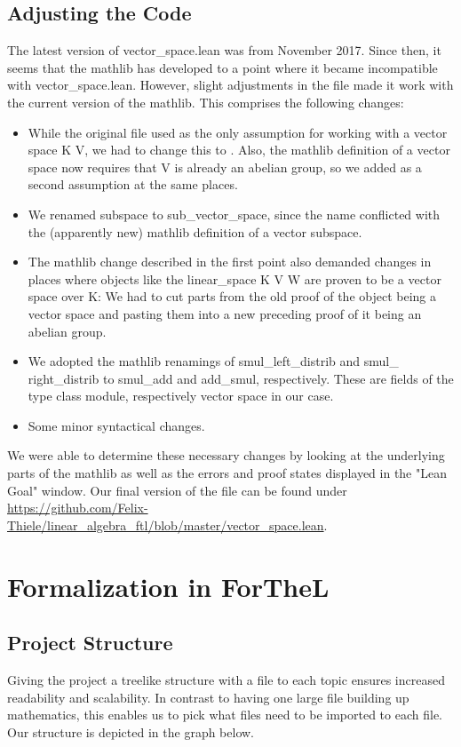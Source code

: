 \documentclass[11pt]{article}
\begin{document}
\subsection{Adjusting the Code}
The latest version of vector\_space.lean was from November 2017. Since then, it seems that the mathlib has developed to a point where it became incompatible with vector\_space.lean.
However, slight adjustments in the file made it work with the current version of the mathlib. This comprises the following changes:
\begin{itemize}
\item While the original file used {\ftl [field K]} as the only assumption for working with a {\ftl vector space K V}, we had to change this to {}. Also, the mathlib definition of a vector space now requires that V is already an abelian group, so we added {} as a second assumption at the same places.
\item We renamed {\lean subspace} to {\lean sub\_vector\_space}, since the name conflicted with the (apparently new) mathlib definition of a vector subspace.
\item The mathlib change described in the first point also demanded changes in places where objects like the {\lean linear\_space K V W} are proven to be a vector space over K: We had to cut parts from the old proof of the object being a vector space and pasting them into a new preceding proof of it being an abelian group. 
\item We adopted the mathlib renamings of {\lean smul\_left\_distrib} and {\lean smul\_ right\_distrib} to {\lean smul\_add} and {\lean add\_smul}, respectively. These are fields of the type class {\lean module}, respectively {\lean vector space} in our case.
\item Some minor syntactical changes.
\end{itemize}
We were able to determine these necessary changes by looking at the underlying parts of the mathlib as well as the errors and proof states displayed in the "Lean Goal" window. Our final version of the file can be found under \url{https://github.com/Felix-Thiele/linear_algebra_ftl/blob/master/vector_space.lean}.



\newpage
\lstset{style=ftl}
\section{Formalization in ForTheL}
\subsection{Project Structure}
Giving the project a treelike structure with a file to each topic ensures increased readability and scalability. 
In contrast to having one large file building up mathematics, this enables us to pick what files need to be imported to each file. 
Our structure is depicted in the graph below.
\end{document}
